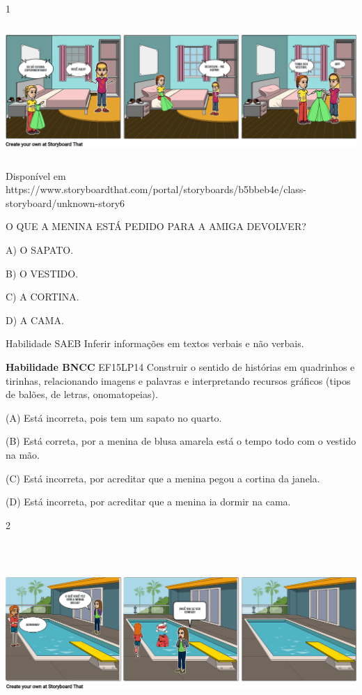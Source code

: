 \begin{escola}
\num{1}

\includegraphics[width=5.90556in,height=1.95278in]{media/image180.png}

Disponível em
https://www.storyboardthat.com/portal/storyboards/b5bbeb4e/class-storyboard/unknown-story6

O QUE A MENINA ESTÁ PEDIDO PARA A AMIGA DEVOLVER?

A) O SAPATO.

B) O VESTIDO.

C) A CORTINA.

D) A CAMA.

Habilidade SAEB Inferir informações em textos verbais e não verbais.

\textbf{Habilidade BNCC} EF15LP14 Construir o sentido de histórias em
quadrinhos e tirinhas, relacionando imagens e palavras e interpretando
recursos gráficos (tipos de balões, de letras, onomatopeias).

(A) Está incorreta, pois tem um sapato no quarto.

(B) Está correta, por a menina de blusa amarela está o tempo todo com o
vestido na mão.

(C) Está incorreta, por acreditar que a menina pegou a cortina da janela.

(D) Está incorreta, por acreditar que a menina ia dormir na cama.

\num{2}

\includegraphics[width=6.12986in,height=2.72778in]{media/image181.png}


\end{escola}
